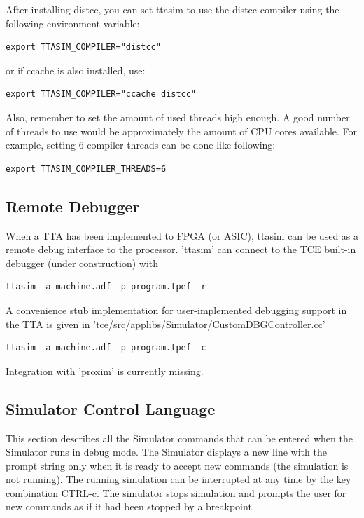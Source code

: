 \documentclass[twoside]{tceusermanual}
\begin{document}
After installing distcc, you can set ttasim to use the distcc compiler using the
following environment variable:
\begin{verbatim}
export TTASIM_COMPILER="distcc"
\end{verbatim} or if ccache is also installed, use:
\begin{verbatim}
export TTASIM_COMPILER="ccache distcc"\end{verbatim}

Also, remember to set the amount of used threads high enough. A good number
of threads to use would be approximately the amount of CPU cores
available. For example, setting 6 compiler threads can be done like following:
\begin{verbatim}
export TTASIM_COMPILER_THREADS=6
\end{verbatim}

\subsection{Remote Debugger}

When a TTA has been implemented to FPGA (or ASIC), ttasim can be used
as a remote debug interface to the processor. 'ttasim' can connect to the
TCE built-in debugger (under construction) with 
\begin{verbatim}
ttasim -a machine.adf -p program.tpef -r
\end{verbatim}

A convenience stub implementation for user-implemented debugging support in the TTA
is given in 'tce/src/applibs/Simulator/CustomDBGController.cc'
\begin{verbatim}
ttasim -a machine.adf -p program.tpef -c
\end{verbatim}

Integration with 'proxim' is currently missing.


\subsection{Simulator Control Language}

This section describes all the Simulator commands that can be entered when
the Simulator runs in debug mode.  The Simulator displays a new line with
the prompt string only when it is ready to accept new commands (the simulation
is not running).  The running simulation can be interrupted at any time by
the key combination CTRL-c.  The simulator stops simulation and prompts the
user for new commands as if it had been stopped by a breakpoint.
\end{document}
